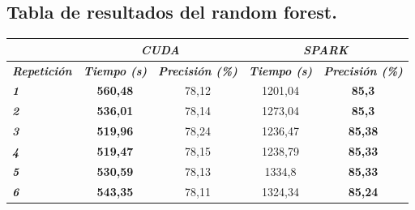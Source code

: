 \newpage
\subsection{Tabla de resultados del random forest.}

\begin{table}[ht]
\begin{tabular}{@{}l|cc|cc|@{}}
                             & \multicolumn{2}{c|}{\textit{\textbf{CUDA}}}                                                              & \multicolumn{2}{c|}{\textit{\textbf{SPARK}}}                                                             \\ \midrule
\textit{\textbf{Repetición}} & \multicolumn{1}{l}{\textit{\textbf{Tiempo (s)}}} & \multicolumn{1}{l|}{\textit{\textbf{Precisión (\%)}}} & \multicolumn{1}{l}{\textit{\textbf{Tiempo (s)}}} & \multicolumn{1}{l|}{\textit{\textbf{Precisión (\%)}}} \\ \midrule
\textit{\textbf{1}}          & \textbf{560,48}                                  & 78,12                                                 & 1201,04                                          & \textbf{85,3}                                         \\
\textit{\textbf{2}}          & \textbf{536,01}                                  & 78,14                                                 & 1273,04                                          & \textbf{85,3}                                         \\
\textit{\textbf{3}}          & \textbf{519,96}                                  & 78,24                                                 & 1236,47                                          & \textbf{85,38}                                        \\
\textit{\textbf{4}}          & \textbf{519,47}                                  & 78,15                                                 & 1238,79                                          & \textbf{85,33}                                        \\
\textit{\textbf{5}}          & \textbf{530,59}                                  & 78,13                                                 & 1334,8                                           & \textbf{85,33}                                        \\
\textit{\textbf{6}}          & \textbf{543,35}                                  & 78,11                                                 & 1324,34                                          & \textbf{85,24}                                        \\

\end{tabular}
\end{table}
